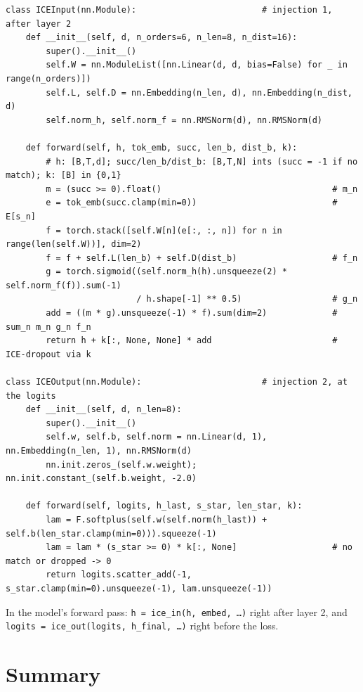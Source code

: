 \documentclass[11pt]{article}
\begin{document}
\begin{lstlisting}
class ICEInput(nn.Module):                         # injection 1, after layer 2
    def __init__(self, d, n_orders=6, n_len=8, n_dist=16):
        super().__init__()
        self.W = nn.ModuleList([nn.Linear(d, d, bias=False) for _ in range(n_orders)])
        self.L, self.D = nn.Embedding(n_len, d), nn.Embedding(n_dist, d)
        self.norm_h, self.norm_f = nn.RMSNorm(d), nn.RMSNorm(d)

    def forward(self, h, tok_emb, succ, len_b, dist_b, k):
        # h: [B,T,d]; succ/len_b/dist_b: [B,T,N] ints (succ = -1 if no match); k: [B] in {0,1}
        m = (succ >= 0).float()                                  # m_n
        e = tok_emb(succ.clamp(min=0))                           # E[s_n]
        f = torch.stack([self.W[n](e[:, :, n]) for n in range(len(self.W))], dim=2)
        f = f + self.L(len_b) + self.D(dist_b)                   # f_n
        g = torch.sigmoid((self.norm_h(h).unsqueeze(2) * self.norm_f(f)).sum(-1)
                          / h.shape[-1] ** 0.5)                  # g_n
        add = ((m * g).unsqueeze(-1) * f).sum(dim=2)             # sum_n m_n g_n f_n
        return h + k[:, None, None] * add                        # ICE-dropout via k

class ICEOutput(nn.Module):                        # injection 2, at the logits
    def __init__(self, d, n_len=8):
        super().__init__()
        self.w, self.b, self.norm = nn.Linear(d, 1), nn.Embedding(n_len, 1), nn.RMSNorm(d)
        nn.init.zeros_(self.w.weight); nn.init.constant_(self.b.weight, -2.0)

    def forward(self, logits, h_last, s_star, len_star, k):
        lam = F.softplus(self.w(self.norm(h_last)) + self.b(len_star.clamp(min=0))).squeeze(-1)
        lam = lam * (s_star >= 0) * k[:, None]                   # no match or dropped -> 0
        return logits.scatter_add(-1, s_star.clamp(min=0).unsqueeze(-1), lam.unsqueeze(-1))
\end{lstlisting}

In the model's forward pass: \texttt{h = ice\_in(h, embed, \dots)} right after layer 2, and \texttt{logits = ice\_out(logits, h\_final, \dots)} right before the loss.

\section{Summary}
\end{document}
